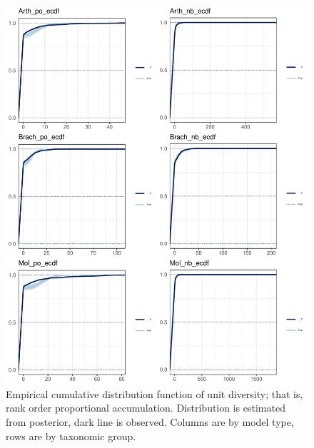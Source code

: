 \documentclass[12pt,letterpaper]{article}
\begin{document}
\afterpage{\clearpage}
\begin{figure}[h]
  \centering
  \includegraphics[width=\textwidth,height=0.8\textheight,keepaspectratio=true]{figure/ppc_ecdf}
  \caption{Empirical cumulative distribution function of unit diversity; that is, rank order proportional accumulation. Distribution is estimated from posterior, dark line is observed. Columns are by model type, rows are by taxonomic group.}
  \label{fig:ppc_ecdf}
\end{figure}
\end{document}
